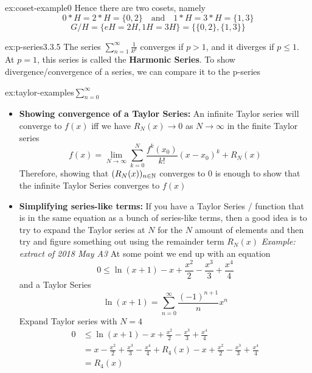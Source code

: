 \documentclass[landscape, 8pt]{extarticle}
\begin{document}
\begin{multicols}{3}
\begin{xmp}{ex:coset-example}{0}
    Hence there are two cosets, namely
    \[0 * H=2 * H=\{0,2\} \quad\text{and}\quad 1 * H=3 * H=\{1,3\}\]
    \[G/H=\{eH=2H,1H=3H\} = \{\{0,2\}, \{1,3\}\}\]
\end{xmp}
\vspace{-5pt}

\begin{xmp}[p-series]{ex:p-series}{3.3.5}
The series $\displaystyle\sum_{n=1}^{\infty} \frac{1}{k^{p}}$ converges if $p > 1$, and it diverges if $p \le 1$. At $p = 1$, this series is called the \textbf{Harmonic Series}.
\vspace{0pt}\newline
To show divergence/convergence of a series, we can compare it to the p-series

\end{xmp}
\vspace{-5pt}

\begin{xmp}{ex:taylor-examples}{$\sum^{\infty}_{n=0}$}
    \renewcommand\labelitemi{\tiny$\bullet$}
    \begin{itemize}
        \setlength\itemsep{0em}
        \item \textbf{Showing convergence of a Taylor Series:} An infinite Taylor series will converge to $f(x)$ iff we have $R_{N}(x) \to 0$ as $N\to\infty$ in the finite Taylor series
        \[\displaystyle f(x) = \lim_{N\to \infty} \sum_{k=0}^{N} \frac{f^k(x_{0})}{k!}(x-x_{0})^k + R_{N}(x)\]
        Therefore, showing that $(R_{N}(x))_{n\in \mathbb{N}}$ converges to $0$ is enough to show that the infinite Taylor Series converges to $f(x)$
        \item \textbf{Simplifying series-like terms:} If you have a Taylor Series / function that is in the same equation as a bunch of series-like terms, then a good idea is to try to expand the Taylor series at $N$ for the $N$ amount of elements and then try and figure something out using the remainder term $R_{N}(x)$
        \vspace{0pt}\newline
        \textit{Example: extract of 2018 May A3}
        \vspace{0pt}\newline
        At some point we end up with an equation
        \[0\le \ln(x + 1) - x + \frac{x^{2}}{2} - \frac{x^{3}}{3} + \frac{x^{4}}{4}\]
        and a Taylor Series
        \[\ln(x+1) = \sum_{n=0}^{\infty} \frac{(-1)^{n+1}}{n}x^n\]
        Expand Taylor series with $N=4$
        \[\begin{aligned}
            0&\le \ln(x + 1) - x + \frac{x^{2}}{2} - \frac{x^{3}}{3} + \frac{x^{4}}{4}\\
            &= x - \frac{x^{2}}{2} + \frac{x^{3}}{3} - \frac{x^{4}}{4} + R_{4}(x) - x + \frac{x^{2}}{2} - \frac{x^{3}}{3} + \frac{x^{4}}{4}\\
            &= R_{4}(x)
        \end{aligned}\]
    \end{itemize}
    \end{xmp}
    \vspace{-5pt}


\end{multicols}
\end{document}
